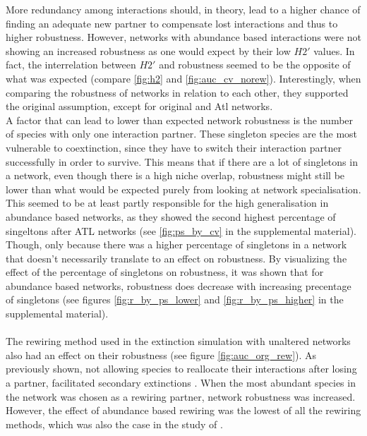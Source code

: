 \documentclass[12pt,a4paper]{article}
\begin{document}
More redundancy among interactions should, in theory, lead to a higher chance of finding an adequate new partner to compensate lost interactions and thus to higher robustness. However, networks with abundance based interactions were not showing an increased robustness as one would expect by their low $H2'$ values. In fact, the interrelation between $H2'$ and robustness seemed to be the opposite of what was expected (compare \ref{fig:h2} and \ref{fig:auc_cv_norew}). Interestingly, when comparing the robustness of networks in relation to each other, they supported the original assumption, except for original and Atl networks.\\ A factor that can lead to lower than expected network robustness is the number of species with only one interaction partner. These singleton species are the most vulnerable to coextinction, since they have to switch their interaction partner successfully in order to survive. This means that if there are a lot of singletons in a network, even though there is a high niche overlap, robustness might still be lower than what would be expected purely from looking at network specialisation. This seemed to be at least partly responsible for the high generalisation in abundance based networks, as they showed the second highest percentage of singeltons after ATL networks (see \ref{fig:ps_by_cv} in the supplemental material). Though, only because there was a higher percentage of singletons in a network that doesn't necessarily translate to an effect on robustness. By visualizing the effect of the percentage of singletons on robustness, it was shown that for abundance based networks, robustness does decrease with increasing precentage of singletons (see figures \ref{fig:r_by_ps_lower} and \ref{fig:r_by_ps_higher} in the supplemental material).\paragraph{}

The rewiring method used in the extinction simulation with unaltered networks also had an effect on their robustness (see figure \ref{fig:auc_org_rew}). As previously shown, not allowing species to reallocate their interactions after losing a partner, facilitated secondary extinctions \parencite{Kaiser-Bunbury2010, Schleuning2016, Timoteo2016, Costa2018}. When the most abundant species in the network was chosen as a rewiring partner, network robustness was increased. However, the effect of abundance based rewiring was the lowest of all the rewiring methods, which was also the case in the study of \parencite{Vizentin-Bugoni2019}. 
\end{document}
